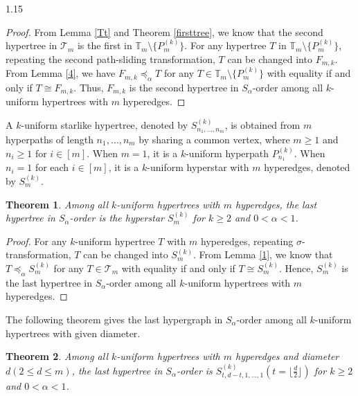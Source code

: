 \documentclass[preprint,12pt]{elsarticle1}
\newtheorem{thm}{Theorem}[section]
\numberwithin{equation}{section}
\begin{document}
\begin{spacing}{1.15}
\begin{proof}
From Lemma \ref{Tt} and Theorem \ref{firsttree}, we know that the second hypertree in $\mathcal{T}_m$ is the first in $\mathbb{T}_{m}\setminus\{P_m^{(k)}\}$. For any hypertree $T$ in $\mathbb{T}_m\setminus\{P_m^{(k)}\}$, repeating the second path-sliding transformation,
$T$ can be changed into $F_{m,k}$. From Lemma \ref{4}, we have $F_{m,k}\preceq_{\alpha}T$ for any $T\in\mathbb{T}_{m}\setminus\{P_m^{(k)}\}$ with equality if and only if $T\cong F_{m,k}$. Thus, $F_{m,k}$ is the second hypertree in $S_{\alpha}$-order among all $k$-uniform hypertrees with $m$ hyperedges.
\end{proof}

A $k$-uniform starlike hypertree, denoted by $S_{n_1,\ldots,n_m}^{(k)}$, is obtained from $m$ hyperpaths of length $n_1,\ldots,n_m$ by sharing a common vertex, where $m\ge1$ and $n_i\ge1$ for $i\in[m]$. When $m=1$, it is a $k$-uniform hyperpath $P_{n_1}^{(k)}$. When $n_i=1$ for each $i\in[m]$, it is a $k$-uniform hyperstar with $m$ hyperedges, denoted by $S_m^{(k)}$.

\begin{thm}\label{lasttree}
Among all $k$-uniform hypertrees with $m$ hyperedges, the last hypertree in $S_{\alpha}$-order is the hyperstar $S_{m}^{(k)}$ for $k\ge2$ and $0<\alpha<1$.
\end{thm}

\begin{proof}
For any $k$-uniform hypertree $T$ with $m$ hyperedges, repeating $\sigma$-transformation, $T$ can be changed into $S_m^{(k)}$. From Lemma \ref{1},
we know that $T\preceq_{\alpha}S_m^{(k)}$ for any $T\in\mathcal{T}_m$ with equality if and only if $T\cong S_m^{(k)}$.
Hence, $S_{m}^{(k)}$ is the last hypertree in $S_{\alpha}$-order among all $k$-uniform hypertrees with $m$ hyperedges.
\end{proof}

The following theorem gives the last hypergraph in $S_{\alpha}$-order among all $k$-uniform hypertrees with given diameter.

\begin{thm}\label{treelastd}
Among all $k$-uniform hypertrees with $m$ hyperedges and diameter $d(2\le d\le m)$, the last hypertree in $S_{\alpha}$-order is $S_{t,d-t,1,\ldots,1}^{(k)}(t=\lfloor\frac{d}{2}\rfloor)$ for $k\ge2$ and $0<\alpha<1$.
\end{thm}


\end{spacing}
\end{document}
